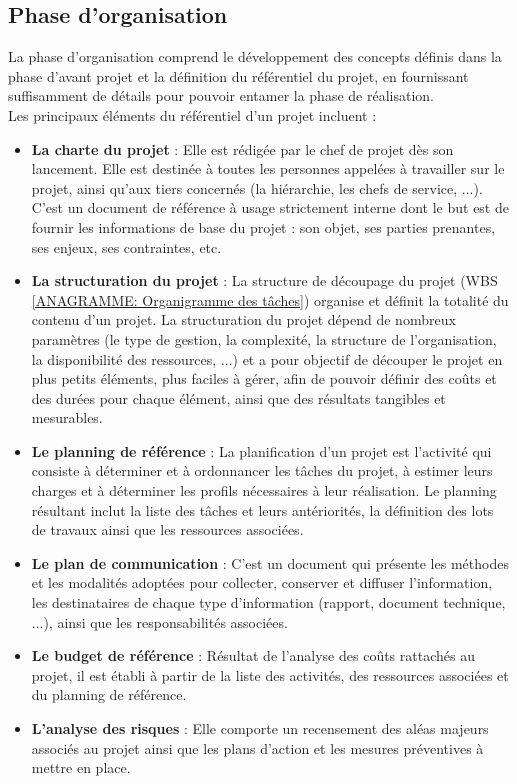\begin{spacing}{1.5}
\subsection{Phase d'organisation}
La phase d'organisation comprend le développement des concepts définis dans la phase d'avant projet et la définition du référentiel du projet, en fournissant suffisamment de détails pour pouvoir entamer la phase de réalisation.\\
Les principaux éléments du référentiel d'un projet incluent :
\begin{itemize}
    \item \textbf{La charte du projet} : Elle est rédigée par le chef de projet dès son lancement. Elle est destinée à toutes les personnes appelées à travailler sur le projet, ainsi qu'aux tiers concernés (la hiérarchie, les chefs de service, ...). C'est un document de référence à usage strictement interne dont le but est de fournir les informations de base du projet : son objet, ses parties prenantes, ses enjeux, ses contraintes, etc.
    \item \textbf{La structuration du projet} : La structure de découpage du projet (WBS \ref{ANAGRAMME: Organigramme des tâches}) organise et définit la totalité du contenu d'un projet. La structuration du projet dépend de nombreux paramètres (le type de gestion, la complexité, la structure de l'organisation, la disponibilité des ressources, ...) et a pour objectif de découper le projet en plus petits éléments, plus faciles à gérer, afin de pouvoir définir des coûts et des durées pour chaque élément, ainsi que des résultats tangibles et mesurables.
    \item \textbf{Le planning de référence} : La planification d'un projet est l’activité qui consiste à déterminer et à ordonnancer les tâches du projet, à estimer leurs charges et à déterminer les profils nécessaires à leur réalisation. Le planning résultant inclut la liste des tâches et leurs antériorités, la définition des lots de travaux ainsi que les ressources associées.
    \item \textbf{Le plan de communication} : C'est un document qui présente les méthodes et les modalités adoptées pour collecter, conserver et diffuser l'information, les destinataires de chaque type d'information (rapport, document technique, ...), ainsi que les responsabilités associées.
    \item \textbf{Le budget de référence} : Résultat de l'analyse des coûts rattachés au projet, il est établi à partir de la liste des activités, des ressources associées et du planning de référence.
    \item \textbf{L'analyse des risques} : Elle comporte un recensement des aléas majeurs associés au projet ainsi que les plans d'action et les mesures préventives à mettre en place.
\end{itemize}


\end{spacing}
